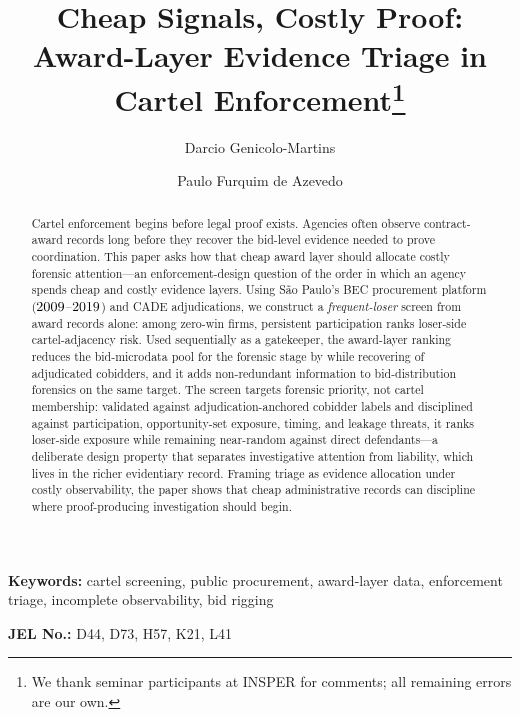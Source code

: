 \begin{frontmatter}

\title{Cheap Signals, Costly Proof: Award-Layer Evidence Triage in Cartel Enforcement\texorpdfstring{\footnote{We thank seminar participants at INSPER for comments; all remaining errors are our own.}}{}}

\author[insper]{Darcio Genicolo-Martins}
\author[insper]{Paulo Furquim de Azevedo}

\begin{abstract}
Cartel enforcement begins before legal proof exists. Agencies
often observe contract-award records long before they recover
the bid-level evidence needed to prove coordination. This paper
asks how that cheap award layer should allocate costly forensic
attention---an enforcement-design question of the order in which
an agency spends cheap and costly evidence layers. Using
S\~ao Paulo's BEC procurement platform
($2009$--$2019$) and CADE adjudications, we
construct a \emph{frequent-loser} screen from award records
alone: among zero-win firms, persistent participation ranks
loser-side cartel-adjacency risk. Used sequentially as a
gatekeeper, the award-layer ranking reduces the bid-microdata
pool for the forensic stage by \valGateFootprintPct{} while
recovering \valGateSeqKTwoKOneTPIn{} of \valCobidders{}
adjudicated cobidders, and it adds non-redundant information to
bid-distribution forensics on the same target. The screen
targets forensic priority, not cartel membership: validated
against adjudication-anchored cobidder labels and disciplined
against participation, opportunity-set exposure, timing, and
leakage threats, it ranks loser-side exposure while remaining
near-random against direct defendants---a deliberate design
property that separates investigative attention from liability,
which lives in the richer evidentiary record. Framing triage as
evidence allocation under costly observability, the paper shows
that cheap administrative records can discipline where
proof-producing investigation should begin.
\end{abstract}

\end{frontmatter}

\noindent\textbf{Keywords:} cartel screening, public procurement, award-layer data, enforcement triage, incomplete observability, bid rigging

\noindent\textbf{JEL No.:} D44, D73, H57, K21, L41

\bigskip
